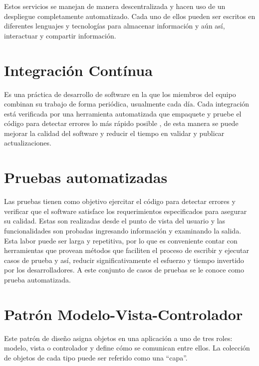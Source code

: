 Estos servicios se manejan de manera descentralizada y hacen uso de un despliegue completamente automatizado. Cada uno de ellos pueden ser escritos en diferentes lenguajes y tecnologías para almacenar información y aún así, interactuar y compartir información. \cite{Microservices2}

\section{Integración Contínua}

Es una práctica de desarrollo de software en la que los miembros del equipo combinan su trabajo de forma periódica, usualmente cada día. Cada integración está verificada por una herramienta automatizada que empaquete y pruebe el código para detectar errores lo más rápido posible \cite{Integracion_Continua}, de esta manera se puede mejorar la calidad del software y reducir el tiempo en validar y publicar actualizaciones.

\section{Pruebas automatizadas}

Las pruebas tienen como objetivo ejercitar el código para detectar errores y verificar que el software satisface los requerimientos especificados para asegurar su calidad. Estas son realizadas desde el punto de vista del usuario y las funcionalidades son probadas ingresando información y examinando la salida. \cite{Pruebas_Automatizadas}\\ 

Esta labor puede ser larga y repetitiva, por lo que es conveniente contar con herramientas que provean métodos que faciliten el proceso de escribir y  ejecutar casos de prueba y así, reducir significativamente el esfuerzo y tiempo invertido por los desarrolladores. \cite{Pruebas_Automatizadas} A este conjunto de casos de pruebas se le conoce como prueba automatizada.

\section{Patrón Modelo-Vista-Controlador}

Este patrón de diseño asigna objetos en una aplicación a uno de tres roles: modelo, vista o controlador y define cómo se comunican entre ellos. La colección de objetos de cada tipo puede ser referido como una “capa”.\cite{MVC}

